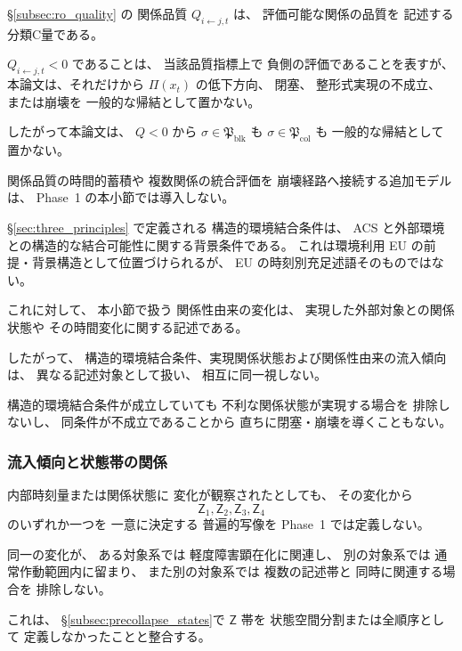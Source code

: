 \begin{remark}
\label{rem:negative_Q_not_collapse}
\S\ref{subsec:ro_quality} の
関係品質
$Q_{i\leftarrow j,t}$
は、
評価可能な関係の品質を
記述する分類C量である。

$Q_{i\leftarrow j,t}<0$
であることは、
当該品質指標上で
負側の評価であることを表すが、
本論文は、それだけから
$\Pi(x_t)$
の低下方向、
閉塞、
整形式実現の不成立、
または崩壊を
一般的な帰結として置かない。

したがって本論文は、
$Q<0$ から
$\sigma\in\mathfrak{P}_{\mathrm{blk}}$ も
$\sigma\in\mathfrak{P}_{\mathrm{col}}$ も
一般的な帰結として置かない。

関係品質の時間的蓄積や
複数関係の統合評価を
崩壊経路へ接続する追加モデルは、
Phase~1 の本小節では導入しない。
\end{remark}

\begin{remark}[構造的環境結合と実現関係変化を区別する]
\label{rem:env_coupling_not_relational_inflow}
\S\ref{sec:three_principles} で定義される
構造的環境結合条件は、
ACS と外部環境との構造的な結合可能性に関する背景条件である。
これは環境利用 EU の前提・背景構造として位置づけられるが、
EU の時刻別充足述語そのものではない。

これに対して、
本小節で扱う
関係性由来の変化は、
実現した外部対象との関係状態や
その時間変化に関する記述である。

したがって、
構造的環境結合条件、実現関係状態および関係性由来の流入傾向は、
異なる記述対象として扱い、
相互に同一視しない。

構造的環境結合条件が成立していても
不利な関係状態が実現する場合を
排除しないし、
同条件が不成立であることから
直ちに閉塞・崩壊を導くこともない。
\end{remark}

\subsubsection{流入傾向と状態帯の関係}

\begin{remark}
\label{rem:inflow_not_unique_zone}
内部時刻量または関係状態に
変化が観察されたとしても、
その変化から
\[
  \mathsf{Z}_1,
  \mathsf{Z}_2,
  \mathsf{Z}_3,
  \mathsf{Z}_4
\]
のいずれか一つを
一意に決定する
普遍的写像を
Phase~1 では定義しない。

同一の変化が、
ある対象系では
軽度障害顕在化に関連し、
別の対象系では
通常作動範囲内に留まり、
また別の対象系では
複数の記述帯と
同時に関連する場合を
排除しない。

これは、
\S\ref{subsec:precollapse_states}で
$\mathsf{Z}$ 帯を
状態空間分割または全順序として
定義しなかったことと整合する。
\end{remark}

